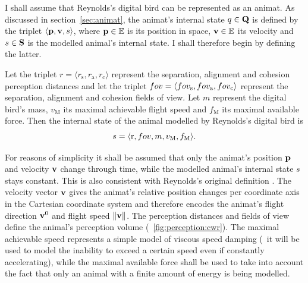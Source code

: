 I shall assume that Reynolds's digital bird can be represented as an animat. As discussed in section~\ref{sec:animat}, the animat's internal state $q \in {\ensuremath{\mathbf{Q}}}$ is defined by the triplet $\langle{\ensuremath{\mathbf{p}}},{\mathbf{v}},s\rangle$, where ${\mathbf{p}} \in \mathbb{E}$ is its position in space, ${\mathbf{v}} \in \mathbb{E}$ its velocity and $s \in {\ensuremath{\mathbf{S}}}$ is the modelled animal's internal state. I shall therefore begin by defining the latter. 

\begin{defn}
\label{def:animat:s:cwr}
Let the triplet $r=\langle r_\mathrm{s}, r_\mathrm{a}, r_\mathrm{c}\rangle$ represent the separation, alignment and cohesion perception distances and let the triplet $fov=\langle fov_\mathrm{s}, fov_\mathrm{a}, fov_\mathrm{c}\rangle$ represent the separation, alignment and cohesion fields of view. Let $m$ represent the digital bird's mass, $v_\mathrm{M}$ its maximal achievable flight speed and $f_\mathrm{M}$ its maximal available force. Then the internal state of the animal modelled by Reynolds's digital bird is 
\begin{equation}
s=\langle \mathrm{r}, fov, m, v_\mathrm{M}, f_\mathrm{M} \rangle.
\end{equation}
\end{defn}
%
\indent For reasons of simplicity it shall be assumed that only the animat's position ${\mathbf{p}}$ and velocity ${\mathbf{v}}$ change through time, while the modelled animal's internal state $s$ stays constant. This is also consistent with Reynolds's original definition \cite{reynolds:1987}. The velocity vector ${\mathbf{v}}$ gives the animat's relative position changes per coordinate axis in the Cartesian coordinate system and therefore encodes the animat's flight direction ${\mathbf{v}}^0$ and flight speed $\left\|{\mathbf{v}}\right\|$. The perception distances and fields of view define the animal's perception volume (\fig~\ref{fig:perception:cwr}). The maximal achievable speed represents a simple model of viscous speed damping (\ie\ it will be used to model the inability to exceed a certain speed even if constantly accelerating), while the maximal available force shall be used to take into account the fact that only an animal with a finite amount of energy is being modelled.

